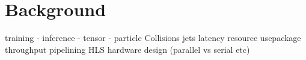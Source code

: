 \chapter{Background}

training - 
inference - 
tensor -
particle Collisions 
jets
latency
resource usepackage
throughput
pipelining
HLS
hardware design (parallel vs serial etc)